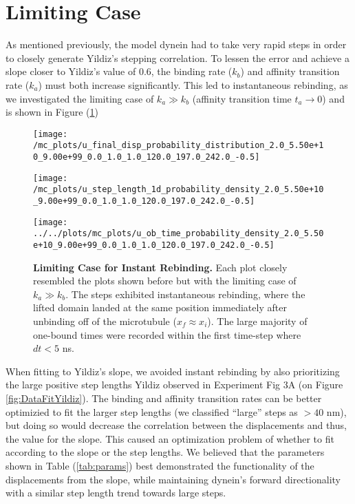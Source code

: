 \newpage
\section{Limiting Case}\label{sec:LimitingCase} 

As mentioned previously, the model dynein had to take very rapid steps in order to closely generate Yildiz's stepping correlation. To lessen the error and achieve a slope closer to Yildiz's value of 0.6, the binding rate ($k_b$) and affinity transition rate ($k_a$) must both increase significantly. This led to instantaneous rebinding, as we investigated the limiting case of $k_a\gg k_b$ (affinity transition time $t_a\to 0$) and is shown in Figure (\ref{fig:DataFitYildiz99})

\begin{figure}[H]
	\begin{minipage}[b]{0.5\textwidth}
	\texttt{[image: /mc\_plots/u\_final\_disp\_probability\_distribution\_2.0\_5.50e+10\_9.00e+99\_0.0\_1.0\_1.0\_120.0\_197.0\_242.0\_-0.5]}
	\end{minipage}
	\begin{minipage}[b]{0.6\textwidth}		
	\texttt{[image: /mc\_plots/u\_step\_length\_1d\_probability\_density\_2.0\_5.50e+10\_9.00e+99\_0.0\_1.0\_1.0\_120.0\_197.0\_242.0\_-0.5]}
	\end{minipage}	
	\begin{center}
	\texttt{[image: ../../plots/mc\_plots/u\_ob\_time\_probability\_density\_2.0\_5.50e+10\_9.00e+99\_0.0\_1.0\_1.0\_120.0\_197.0\_242.0\_-0.5]}
	\end{center}	
	\caption[Limiting Case]{\textbf{Limiting Case for Instant Rebinding.} Each plot closely resembled the plots shown before but with the limiting case of $k_a\gg k_b$. The steps exhibited instantaneous rebinding, where the lifted domain landed at the same position immediately after unbinding off of the microtubule ($x_f\approx x_i$). The large majority of one-bound times were recorded within the first time-step where $dt<5$ ns.} 
	\label{fig:DataFitYildiz99}
\end{figure}

When fitting to Yildiz's slope, we avoided instant rebinding by also prioritizing the large positive step lengths Yildiz observed in Experiment Fig 3A (on Figure \ref{fig:DataFitYildiz}). The binding and affinity transition rates can be better optimizied to fit the larger step lengths (we classified ``large'' steps as $> 40$ nm), but doing so would decrease the correlation between the displacements and thus, the value for the slope. This caused an optimization problem of whether to fit according to the slope or the step lengths. We believed that the parameters shown in Table (\ref{tab:params}) best demonstrated the functionality of the displacements from the slope, while maintaining dynein's forward directionality with a similar step length trend towards large steps.

